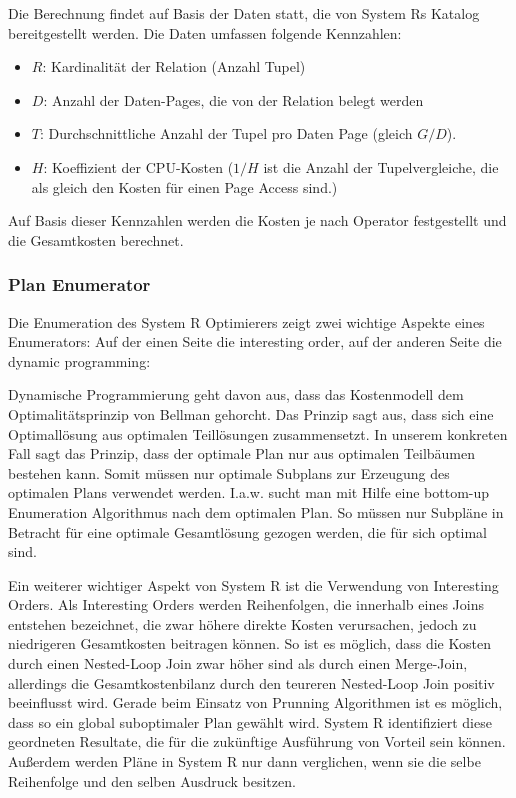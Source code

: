 Die Berechnung findet auf Basis der Daten statt, die von System Rs Katalog bereitgestellt werden. Die Daten umfassen folgende Kennzahlen:

\begin{itemize}
\item $R$: Kardinalität der Relation (Anzahl Tupel)
\item $D$: Anzahl der Daten-Pages, die von der Relation belegt werden
\item $T$: Durchschnittliche Anzahl der Tupel pro Daten Page (gleich $G/D$).
\item $H$: Koeffizient der CPU-Kosten ($1/H$ ist die Anzahl der Tupelvergleiche, die  als gleich den Kosten für einen Page Access sind.)
\end{itemize}

Auf Basis dieser Kennzahlen werden die Kosten je nach Operator festgestellt und die Gesamtkosten berechnet. 




\subsubsection{Plan Enumerator}
Die Enumeration des System R Optimierers zeigt zwei wichtige Aspekte eines Enumerators: Auf der einen Seite die interesting order, auf der anderen Seite die dynamic programming:

Dynamische Programmierung geht davon aus, dass das Kostenmodell dem Optimalitätsprinzip von Bellman \cite{Bellman:1957} gehorcht. Das Prinzip sagt aus, dass sich eine Optimallösung aus optimalen Teillösungen zusammensetzt. In unserem konkreten Fall sagt das Prinzip, dass der optimale Plan nur aus optimalen Teilbäumen bestehen kann. Somit müssen nur optimale Subplans zur Erzeugung des optimalen Plans verwendet werden. I.a.w. sucht man mit Hilfe eine bottom-up Enumeration Algorithmus nach dem optimalen Plan. So müssen nur Subpläne in Betracht für eine optimale Gesamtlösung gezogen werden, die für sich optimal sind.



Ein weiterer wichtiger Aspekt von System R ist die Verwendung von Interesting Orders. Als Interesting Orders werden Reihenfolgen, die innerhalb eines Joins entstehen bezeichnet, die zwar höhere direkte Kosten verursachen, jedoch zu niedrigeren Gesamtkosten beitragen können. So ist es möglich, dass die Kosten durch einen Nested-Loop Join zwar höher sind als durch einen Merge-Join, allerdings die Gesamtkostenbilanz durch den teureren Nested-Loop Join positiv beeinflusst wird. Gerade beim Einsatz von Prunning Algorithmen ist es möglich, dass so ein global suboptimaler Plan gewählt wird. System R identifiziert diese geordneten Resultate, die für die zukünftige Ausführung von Vorteil sein können. Außerdem werden Pläne in System R nur dann verglichen, wenn sie die selbe Reihenfolge und den selben Ausdruck besitzen. 